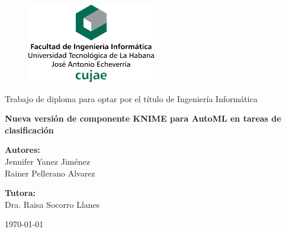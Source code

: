 \begin{figure}
	\centering
	\includegraphics[width=0.5\textwidth]{figuras/membrete-cujae-centrado.png}
\end{figure}

	\begin{center}
		
	\vspace{2cm}

	
	
	\large{Trabajo de diploma para optar por el título de Ingeniería Informática}

	\vspace{2cm}
	

	\LARGE{\textbf{Nueva versión de componente KNIME para AutoML en tareas de clasificación}}
	
	
	
	\vspace{2cm}
	
	\large{
	\textbf{Autores:} \\
	Jennifer Yanez Jiménez\\
	Rainer Pellerano Alvarez\\
	\vspace{1.5cm}
	
	\textbf{Tutora:}\\
	Dra. Raisa Socorro Llanes\\
	}
	
	\vspace{2cm}
	
	{\mifecha\today}
	
\end{center}	


